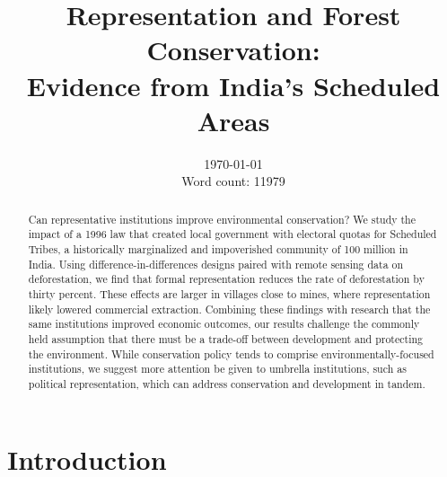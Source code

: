 \documentclass[12pt,reqno]{article}
\title{\textbf{Representation and Forest Conservation: \\ Evidence from India's Scheduled Areas}}
\date{\smallskip \today \\ Word count: 11979}
\renewcommand \thepart{}
\begin{document}
\doparttoc %
\faketableofcontents %

\thispagestyle{empty}
\maketitle

\begin{abstract} \singlespacing

Can representative institutions improve environmental conservation? We study the impact of a 1996 law that created local government with electoral quotas for Scheduled Tribes, a historically marginalized and impoverished community of 100 million in India. Using difference-in-differences designs paired with remote sensing data on deforestation, we find that formal representation reduces the rate of deforestation by thirty percent. These effects are larger in villages close to mines, where representation likely lowered commercial extraction. Combining these findings with research that the same institutions improved economic outcomes, our results challenge the commonly held assumption that there must be a trade-off between development and protecting the environment. While conservation policy tends to comprise environmentally-focused institutions, we suggest more attention be given to umbrella institutions, such as political representation, which can address conservation and development in tandem.

\end{abstract}




\newpage

\thepart{}
\setcounter{page}{1}
\section{Introduction} %
\label{sec:introduction}


\end{document}
